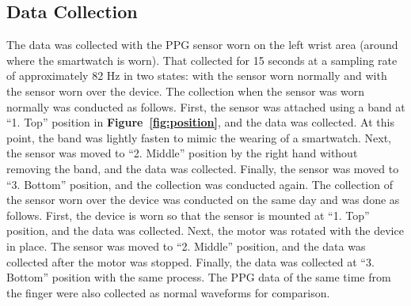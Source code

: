 \documentclass[sigconf]{acmart}
\newcommand\figref[1]{\textbf{Figure~\ref{fig:#1}}}
\begin{document}
\subsection{Data Collection}
The data was collected with the PPG sensor worn on the left wrist area (around where the smartwatch is worn). That collected for 15 seconds at a sampling rate of approximately 82 Hz in two states: with the sensor worn normally and with the sensor worn over the device. The collection when the sensor was worn normally was conducted as follows. First, the sensor was attached using a band at ``1. Top'' position in \figref{position}, and the data was collected. At this point, the band was lightly fasten to mimic the wearing of a smartwatch. Next, the sensor was moved to ``2. Middle'' position by the right hand without removing the band, and the data was collected. Finally, the sensor was moved to ``3. Bottom'' position, and the collection was conducted again. The collection of the sensor worn over the device was conducted on the same day and was done as follows. First, the device is worn so that the sensor is mounted at ``1. Top'' position, and the data was collected. Next, the motor was rotated with the device in place. The sensor was moved to ``2. Middle'' position, and the data was collected after the motor was stopped. Finally, the data was collected at ``3. Bottom'' position with the same process. The PPG data of the same time from the finger were also collected as normal waveforms for comparison.
\end{document}
